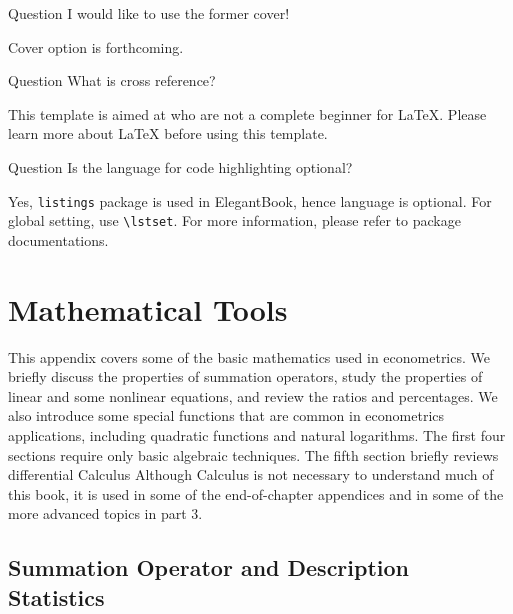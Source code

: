 \documentclass[fancy,blue,11pt]{elegantbook}
\begin{document}
\begin{custom}{Question}
	I would like to use the former cover!
\end{custom}

\begin{solution}
	Cover option is forthcoming.
\end{solution}



\begin{custom}{Question}
	What is cross reference?
\end{custom}

\begin{solution}
	This template is aimed at who are not a complete beginner for \LaTeX{}. Please learn more about \LaTeX{} before using this template.
\end{solution}


\begin{custom}{Question}
	Is the language for code highlighting optional?
\end{custom}

\begin{solution}
	Yes, \lstinline{listings} package is used in ElegantBook, hence language is optional. For global setting, use \lstinline{\lstset}. For more information, please refer to package documentations.
\end{solution}


\nocite{en1,en2,en3} 


\appendix
\chapter{Mathematical Tools}

This appendix covers some of the basic mathematics used in econometrics. We briefly discuss the properties of summation operators, study the properties of linear and some nonlinear equations, and review the ratios and percentages. We also introduce some special functions that are common in econometrics applications, including quadratic functions and natural logarithms. The first four sections require only basic algebraic techniques. The fifth section briefly reviews differential Calculus Although Calculus is not necessary to understand much of this book, it is used in some of the end-of-chapter appendices and in some of the more advanced topics in part 3.

\section{Summation Operator and Description Statistics}
\end{document}

